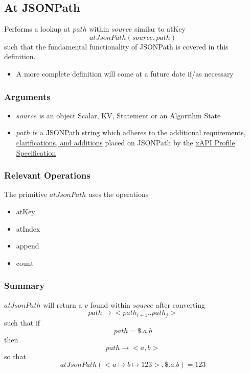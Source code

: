 \documentclass[../main.tex]{subfiles}
\begin{document}
\subsection{At JSONPath}
Performs a lookup at $path$ within $source$ similar to atKey
$$atJsonPath(source, path)$$
such that the fundamental functionality of JSONPath is covered in this definition.
\begin{itemize}
\item A more complete definition will come at a future date if/as necessary
\end{itemize}

\subsubsection{Arguments}
\begin{itemize}
\item $source$ is an object Scalar, KV, Statement or an Algorithm State
\item $path$ is a \href{https://goessner.net/articles/JsonPath/index.html#e2}{JSONPath string} which adheres to the
  \href{https://github.com/adlnet/xapi-profiles/blob/master/xapi-profiles-structure.md#81-statement-template-rules}{additional requirements, clarifications, and additions} placed on JSONPath by the \href{https://github.com/adlnet/xapi-profiles/blob/master/xapi-profiles-structure.md#part-two}{xAPI Profile Specification}
\end{itemize}

\subsubsection{Relevant Operations}
The primitive $atJsonPath$ uses the operations
\begin{itemize}
\item atKey
\item atIndex
\item append
\item count
\end{itemize}

\subsubsection{Summary}
$atJsonPath$ will return a $v$ found within $source$ after converting
$$path \to <path_{i+1}..path_{j}>$$
such that if
$$path = \$.a.b$$
then
$$path \to <a, b>$$
so that
$$atJsonPath(<a \mapsto b \mapsto 123>, \$.a.b) = 123$$
\end{document}
